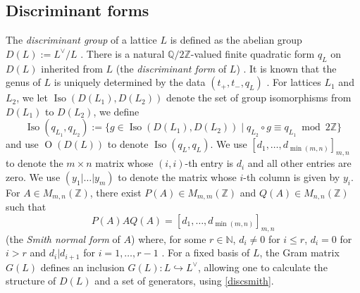 \documentclass[12pt, a4paper]{article}
\newcommand{\ZZ}{\mathbb{Z}}
\newcommand{\QQ}{\mathbb{Q}}
\newcommand{\NN}{\mathbb{N}}
\newcommand{\beq}{\begin{equation*}}
\newcommand{\eeq}{\end{equation*}}
\newcommand{\opn}{\operatorname}
\begin{document}
\subsection{Discriminant forms}
The \emph{discriminant group} of a lattice $L$ is defined as the abelian group $D(L):=L^{\vee}/L$ \cite{Nikulin}.
There is a natural $\QQ/2\ZZ$-valued finite quadratic form $q_L$ on $D(L)$ inherited from $L$ (the \emph{discriminant form} of $L$) \cite{Nikulin}.
It is known that the genus of $L$ is uniquely determined by the data $(t_+, t_-, q_L)$ \cite{Nikulin}.
For lattices $L_1$ and $L_2$, we let $\opn{Iso}(D(L_1), D(L_2))$ denote the set of group isomorphisms from $D(L_1)$ to $D(L_2)$, we define 
\beq
\opn{Iso}(q_{L_1}, q_{L_2}) := \{ g \in \opn{Iso}(D(L_1), D(L_2)) \mid 
q_{L_2} \circ g \equiv q_{L_1} \bmod{2 \ZZ} \}
\eeq
and use $\opn{O}(D(L))$ to denote $\opn{Iso}(q_L, q_L)$.
We use $[d_1, \ldots, d_{\opn{min}(m,n)}]_{m,n}$ to denote the $m \times n$ matrix whose $(i,i)$-th entry is $d_i$ and all other entries are zero.
We use $(y_1 \vert \ldots \vert y_m)$ to denote the matrix whose $i$-th column is given by $y_i$.
For $A \in M_{m,n}(\ZZ)$, there exist $P(A) \in M_{m,m}(\ZZ)$ and $Q(A) \in M_{n,n}(\ZZ)$ such that
\begin{equation}\label{discsmith}
P(A) A Q(A) = [d_1, \ldots, d_{\opn{min}(m,n)}]_{m,n}
\end{equation}
(the \emph{Smith normal form} of $A$) where, for some $r \in \NN$,  $d_i \neq 0$ for $i \leq r$, $d_i=0$ for $i>r$ and $d_i \vert d_{i+1}$ for $i=1, \ldots, r-1$ \cite{morris}.
For a fixed basis of $L$, the Gram matrix $G(L)$ defines an inclusion $G(L):L \hookrightarrow L^{\vee}$, allowing one to calculate the structure of $D(L)$ and a set of generators, using \eqref{discsmith}.
\end{document}
